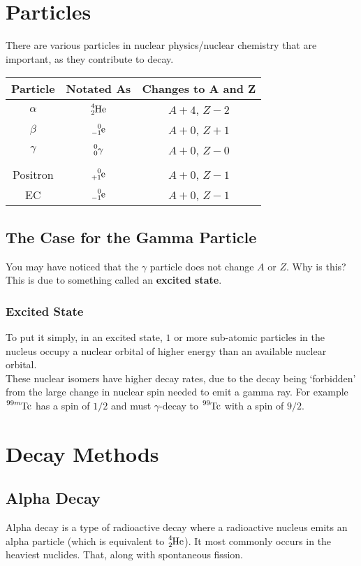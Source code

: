 \documentclass{article}
\begin{document}
\begin{multicols*}{2}
    \section{Particles}
    There are various particles in nuclear physics/nuclear chemistry that are
    important, as they contribute to decay.\\

    \begin{tabular}{|c|c|c|}
      \hline
      Particle & Notated As & Changes to A and Z \\
      \hline
      $\alpha$ & $\ce{^4_2He}$ & $A+4$, $Z-2$ \\
      $\beta$ & $\ce{^0_-1e}$ & $A+0$, $Z+1$ \\
      $\gamma$ & $\ce{^0_0\gamma}$ & $A+0$, $Z-0$\\
       &  &   \\
      Positron & $\ce{^0_{+1}e}$ & $A+0$, $Z-1$\\
      EC & $\ce{^0_-1e}$ & $A+0$, $Z-1$\\
      \hline
    \end{tabular}

    \subsection{The Case for the Gamma Particle}
    You may have noticed that the $\gamma$ particle does not change $A$ or $Z$.
    Why is this? This is due to something called an \textbf{excited state}.
    
    \subsubsection{Excited State}
    To put it simply, in an excited state, $1$ or more sub-atomic particles in
    the nucleus occupy a nuclear orbital of higher energy than an available
    nuclear orbital.\\
    
    These nuclear isomers have higher decay rates, due to the decay being
    `forbidden' from the large change in nuclear spin needed to emit a
    gamma ray. For example $\ce{^{99m}Tc}$ has a spin of $1/2$ and must
    $\gamma$-decay to $\ce{^{99}Tc}$ with a spin of $9/2$.

    \section{Decay Methods}
    \subsection{Alpha Decay}
    Alpha decay is a type of radioactive decay where a radioactive nucleus
    emits an alpha particle (which is equivalent to $\ce{^4_2He}$). It most
    commonly occurs in the heaviest nuclides. That, along with spontaneous
    fission.


\end{multicols*}
\end{document}
